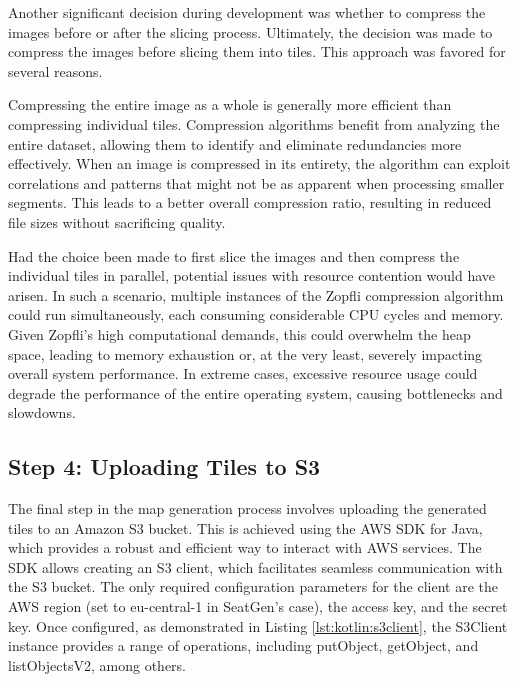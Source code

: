 Another significant decision during development was whether to compress the images before or after the slicing process. Ultimately, the decision was made to compress the images before slicing them into tiles. This approach was favored for several reasons.

Compressing the entire image as a whole is generally more efficient than compressing individual tiles. Compression algorithms benefit from analyzing the entire dataset, allowing them to identify and eliminate redundancies more effectively. When an image is compressed in its entirety, the algorithm can exploit correlations and patterns that might not be as apparent when processing smaller segments. This leads to a better overall compression ratio, resulting in reduced file sizes without sacrificing quality.

Had the choice been made to first slice the images and then compress the individual tiles in parallel, potential issues with resource contention would have arisen. In such a scenario, multiple instances of the Zopfli compression algorithm could run simultaneously, each consuming considerable CPU cycles and memory. Given Zopfli’s high computational demands, this could overwhelm the heap space, leading to memory exhaustion or, at the very least, severely impacting overall system performance. In extreme cases, excessive resource usage could degrade the performance of the entire operating system, causing bottlenecks and slowdowns.

\subsection{Step 4: Uploading Tiles to S3}

The final step in the map generation process involves uploading the generated tiles to an Amazon S3 bucket. This is achieved using the AWS SDK for Java, which provides a robust and efficient way to interact with AWS services. The SDK allows creating an S3 client, which facilitates seamless communication with the S3 bucket. The only required configuration parameters for the client are the AWS region (set to eu-central-1 in SeatGen's case), the access key, and the secret key. Once configured, as demonstrated in Listing \ref{lst:kotlin:s3client}, the S3Client instance provides a range of operations, including putObject, getObject, and listObjectsV2, among others.

